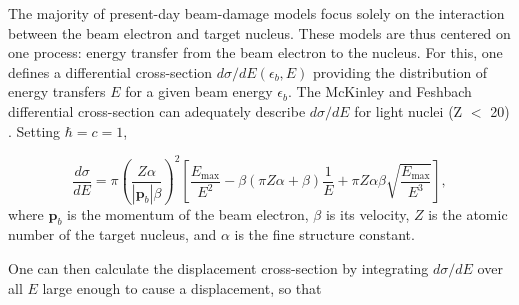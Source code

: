 \documentclass{article}
\begin{document}
The majority of present-day beam-damage models focus solely on the interaction
between the beam electron and target nucleus.
These models are thus centered on one process: energy transfer from the beam
electron to the nucleus.
For this, one defines a differential cross-section $d\sigma/dE(\epsilon_b, E)$
providing the distribution of energy transfers $E$ for a given beam energy
$\epsilon_b$.
The McKinley and Feshbach differential cross-section can adequately describe
$d\sigma/dE$
for light nuclei (Z $<$ 20) \cite{Mott1929, McKinley1948, Oen1973,
Egerton2010}.  Setting $\hbar = c = 1$,

\begin{equation}
  \frac{d\sigma}{dE}
  =
  \pi\left(\frac{Z\alpha}{|\mathbf{p}_b|\beta}\right)^2
  \left[
    \frac{E_\text{max}}{E^2}
    - \beta(\pi Z\alpha+\beta)\frac{1}{E}
    + \pi Z\alpha\beta\sqrt{\frac{E_\text{max}}{E^3}}
  \right],
  \label{eq:MF}
\end{equation}
%
where $\mathbf{p}_b$ is the momentum of the beam electron, $\beta$ is its
velocity, $Z$ is the atomic number of the target nucleus, and $\alpha$ is the
fine structure constant.

One can then calculate the displacement cross-section by integrating
$d\sigma/dE$ over all $E$ large enough to cause a displacement, so that
\end{document}
